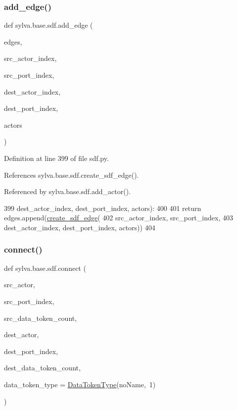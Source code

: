 \subsubsection{\texorpdfstring{add\+\_\+edge()}{add\_edge()}}
{\footnotesize\ttfamily def sylva.\+base.\+sdf.\+add\+\_\+edge (\begin{DoxyParamCaption}\item[{}]{edges,  }\item[{}]{src\+\_\+actor\+\_\+index,  }\item[{}]{src\+\_\+port\+\_\+index,  }\item[{}]{dest\+\_\+actor\+\_\+index,  }\item[{}]{dest\+\_\+port\+\_\+index,  }\item[{}]{actors }\end{DoxyParamCaption})}



Definition at line 399 of file sdf.\+py.



References sylva.\+base.\+sdf.\+create\+\_\+sdf\+\_\+edge().



Referenced by sylva.\+base.\+sdf.\+add\+\_\+actor().


\begin{DoxyCode}
399                  dest\_actor\_index, dest\_port\_index, actors):
400 
401         \textcolor{keywordflow}{return} edges.append(\hyperlink{namespacesylva_1_1base_1_1sdf_a7c688b99c9dcb365aa7598c79f038839}{create\_sdf\_edge}(
402             src\_actor\_index, src\_port\_index,
403             dest\_actor\_index, dest\_port\_index, actors))
404 
\end{DoxyCode}
\mbox{\label{namespacesylva_1_1base_1_1sdf_a0c4055dfc61c95b2f23e5a5dba353302}} 
\subsubsection{\texorpdfstring{connect()}{connect()}}
{\footnotesize\ttfamily def sylva.\+base.\+sdf.\+connect (\begin{DoxyParamCaption}\item[{}]{src\+\_\+actor,  }\item[{}]{src\+\_\+port\+\_\+index,  }\item[{}]{src\+\_\+data\+\_\+token\+\_\+count,  }\item[{}]{dest\+\_\+actor,  }\item[{}]{dest\+\_\+port\+\_\+index,  }\item[{}]{dest\+\_\+data\+\_\+token\+\_\+count,  }\item[{}]{data\+\_\+token\+\_\+type = {\ttfamily \hyperlink{classsylva_1_1base_1_1sdf_1_1_data_token_type}{Data\+Token\+Type}(\textquotesingle{}noName\textquotesingle{},~1)} }\end{DoxyParamCaption})}

